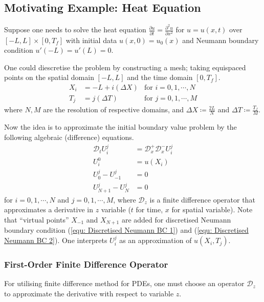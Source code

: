 \documentclass[../dissertation.tex]{subfiles}
\begin{document}
\subsection{Motivating Example: Heat Equation}
Suppose one needs to solve the heat equation $\frac{\partial u}{\partial t} = \frac{\partial^2 u}{\partial x^2}$ for $u = u(x,t)$ over $\left[ -L, L \right] \times \left[ 0, T_f \right]$
with initial data $u\left( x,0 \right) = u_0 (x)$
and Neumann boundary condition $u'(-L) = u'(L) = 0$.

One could diescretise the problem by constructing a mesh;
taking equispaced points on the spatial domain $\left[ -L,L \right]$
and the time domain $\left[ 0,T_f \right]$.
\begin{align*}
    X_i &= -L + i \left( \Delta X \right) & \text{for } i = 0, 1, \cdots, N \\
    T_j &= j \left( \Delta T \right) & \text{for } j = 0, 1, \cdots, M
\end{align*}
where $N, M$ are the resolution of respective domains,
and $\Delta X \coloneqq \frac{2L}{N}$ and $\Delta T \coloneqq \frac{T_f}{M}$.

Now the idea is to approximate the initial boundary value problem by the following algebraic (difference) equations.
\begin{align}
    \mathcal{D}_t U_{i}^j &= \mathcal{D}_x^+ \mathcal{D}_x^- U_{i}^j 
    \label{equ: Discretised Heat Equation}
    \\
    U_{i}^0 &= u\left( X_i \right) \\
    U_{0}^j - U_{-1}^j &= 0
    \label{equ: Discretised Neumann BC 1}
    \\
    U_{N+1}^j - U_{N}^j &= 0
    \label{equ: Discretised Neumann BC 2}
\end{align}
for $i=0,1,\cdots,N$ and $j = 0, 1, \cdots, M$,
where $\mathcal{D}_z$ is a finite difference operator that approximates a derivative in $z$ variable ($t$ for time, $x$ for spatial variable).
Note that ``virtual points'' $X_{-1}$ and $X_{N+1}$ are added for discretised Neumann boundary condition (\ref{equ: Discretised Neumann BC 1}) and (\ref{equ: Discretised Neumann BC 2}).
One interprets $U_i^j$ as an approximation of $u \left( X_i, T_j \right)$.

\subsubsection{First-Order Finite Difference Operator}
For utilising finite difference method for PDEs, one must choose an operator $\mathcal{D}_z$ to approximate the derivative with respect to variable $z$.
\end{document}
